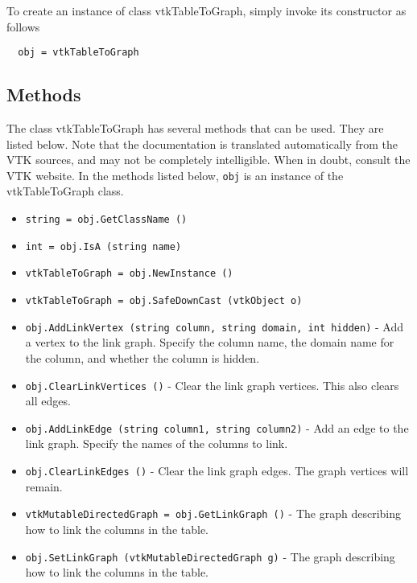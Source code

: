 To create an instance of class vtkTableToGraph, simply
invoke its constructor as follows
\begin{verbatim}
  obj = vtkTableToGraph
\end{verbatim}
\subsection{Methods}

The class vtkTableToGraph has several methods that can be used.
  They are listed below.
Note that the documentation is translated automatically from the VTK sources,
and may not be completely intelligible.  When in doubt, consult the VTK website.
In the methods listed below, \verb|obj| is an instance of the vtkTableToGraph class.
\begin{itemize}
\item  \verb|string = obj.GetClassName ()|

\item  \verb|int = obj.IsA (string name)|

\item  \verb|vtkTableToGraph = obj.NewInstance ()|

\item  \verb|vtkTableToGraph = obj.SafeDownCast (vtkObject o)|

\item  \verb|obj.AddLinkVertex (string column, string domain, int hidden)| -  Add a vertex to the link graph.  Specify the column name, the domain name
 for the column, and whether the column is hidden.

\item  \verb|obj.ClearLinkVertices ()| -  Clear the link graph vertices.  This also clears all edges.

\item  \verb|obj.AddLinkEdge (string column1, string column2)| -  Add an edge to the link graph.  Specify the names of the columns to link.

\item  \verb|obj.ClearLinkEdges ()| -  Clear the link graph edges.  The graph vertices will remain.

\item  \verb|vtkMutableDirectedGraph = obj.GetLinkGraph ()| -  The graph describing how to link the columns in the table.

\item  \verb|obj.SetLinkGraph (vtkMutableDirectedGraph g)| -  The graph describing how to link the columns in the table.


\end{itemize}
